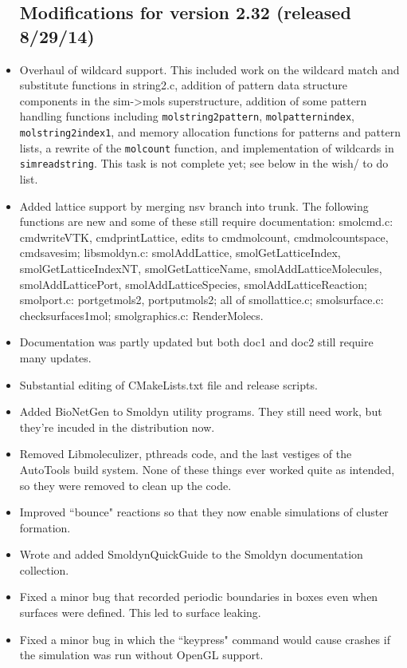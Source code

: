 \documentclass {scrbook}
\newcommand {\ttt} {\texttt}
\begin{document}
\begin{itemize}
\subsection{Modifications for version 2.32 (released 8/29/14)}
\item Overhaul of wildcard support. This included work on the wildcard match and substitute functions in string2.c, addition of pattern data structure components in the sim->mols superstructure, addition of some pattern handling functions including \ttt{molstring2pattern}, \ttt{molpatternindex}, \ttt{molstring2index1}, and memory allocation functions for patterns and pattern lists, a rewrite of the \ttt{molcount} function, and implementation of wildcards in \ttt{simreadstring}. This task is not complete yet; see below in the wish/ to do list.
\item Added lattice support by merging nsv branch into trunk. The following functions are new and some of these still require documentation: smolcmd.c: cmdwriteVTK, cmdprintLattice, edits to cmdmolcount, cmdmolcountspace, cmdsavesim; libsmoldyn.c: smolAddLattice, smolGetLatticeIndex, smolGetLatticeIndexNT, smolGetLatticeName, smolAddLatticeMolecules, smolAddLatticePort, smolAddLatticeSpecies, smolAddLatticeReaction; smolport.c: portgetmols2, portputmols2; all of smollattice.c; smolsurface.c: checksurfaces1mol; smolgraphics.c: RenderMolecs.
\item Documentation was partly updated but both doc1 and doc2 still require many updates.
\item Substantial editing of CMakeLists.txt file and release scripts.
\item Added BioNetGen to Smoldyn utility programs. They still need work, but they're incuded in the distribution now.
\item Removed Libmoleculizer, pthreads code, and the last vestiges of the AutoTools build system. None of these things ever worked quite as intended, so they were removed to clean up the code.
\item Improved ``bounce" reactions so that they now enable simulations of cluster formation.
\item Wrote and added SmoldynQuickGuide to the Smoldyn documentation collection.
\item Fixed a minor bug that recorded periodic boundaries in boxes even when surfaces were defined. This led to surface leaking.
\item Fixed a minor bug in which the ``keypress" command would cause crashes if the simulation was run without OpenGL support.


\end{itemize}
\end{document}
